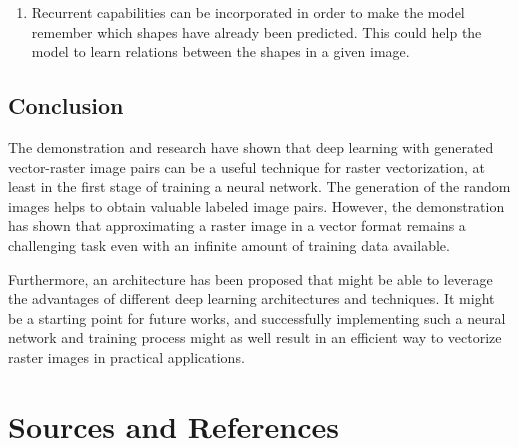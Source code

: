 \documentclass[12pt, a4paper, titlepage]{report}
\begin{document}
\begin{enumerate}[label=\Roman*.]
   \item Recurrent capabilities can be incorporated in order to make the model remember which shapes have already been predicted. This could help the model to learn relations between the shapes in a given image.
\end{enumerate}


\pagebreak
\section{Conclusion}

The demonstration and research have shown that deep learning with generated vector-raster image pairs can be a useful technique for raster vectorization, at least in the first stage of training a neural network. The generation of the random images helps to obtain valuable labeled image pairs. However, the demonstration has shown that approximating a raster image in a vector format remains a challenging task even with an infinite amount of training data available.

Furthermore, an architecture has been proposed that might be able to leverage the advantages of different deep learning architectures and techniques. It might be a starting point for future works, and successfully implementing such a neural network and training process might as well result in an efficient way to vectorize raster images in practical applications.





\chapter{Sources and References}

\nocite{*}  %

\begin{refcontext}[labelprefix=T]
   \printbibliography[type=misc, keyword={TextResource}, title={Text Sources and References}]
\end{refcontext}

\begin{refcontext}[labelprefix=I]
  \printbibliography[type=misc, keyword={ImageResource}, title={Image Resources}]
\end{refcontext}

\begin{refcontext}[labelprefix=A]
   \printbibliography[type=misc, keyword={AITool}, title={AI Tools}]
\end{refcontext}

\end{document}
